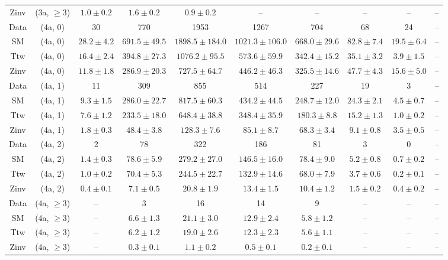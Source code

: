 \begin{table}[h!]
{\begin{tabular}{cccccccccc}
	Zinv & (3a, $\ge3$) & $1.0\pm 0.2$ & $1.6\pm 0.2$ & $0.9\pm 0.2$ & -- & -- & -- & -- & -- \\[0.5ex] 
	Data & (4a, 0) & 30 & 770 & 1953 & 1267 & 704 & 68 & 24 & -- \\[0.5ex] 
	SM & (4a, 0) & $28.2\pm 4.2$ & $691.5\pm 49.5$ & $1898.5\pm 184.0$ & $1021.3\pm 106.0$ & $668.0\pm 29.6$ & $82.8\pm 7.4$ & $19.5\pm 6.4$ & -- \\[0.5ex] 
	Ttw & (4a, 0) & $16.4\pm 2.4$ & $394.8\pm 27.3$ & $1076.2\pm 95.5$ & $573.6\pm 59.9$ & $342.4\pm 15.2$ & $35.1\pm 3.2$ & $3.9\pm 1.5$ & -- \\[0.5ex] 
	Zinv & (4a, 0) & $11.8\pm 1.8$ & $286.9\pm 20.3$ & $727.5\pm 64.7$ & $446.2\pm 46.3$ & $325.5\pm 14.6$ & $47.7\pm 4.3$ & $15.6\pm 5.0$ & -- \\[0.5ex] 
	Data & (4a, 1) & 11 & 309 & 855 & 514 & 227 & 19 & 3 & -- \\[0.5ex] 
	SM & (4a, 1) & $9.3\pm 1.5$ & $286.0\pm 22.7$ & $817.5\pm 60.3$ & $434.2\pm 44.5$ & $248.7\pm 12.0$ & $24.3\pm 2.1$ & $4.5\pm 0.7$ & -- \\[0.5ex] 
	Ttw & (4a, 1) & $7.6\pm 1.2$ & $233.5\pm 18.0$ & $648.4\pm 38.8$ & $348.4\pm 35.9$ & $180.3\pm 8.8$ & $15.2\pm 1.3$ & $1.0\pm 0.2$ & -- \\[0.5ex] 
	Zinv & (4a, 1) & $1.8\pm 0.3$ & $48.4\pm 3.8$ & $128.3\pm 7.6$ & $85.1\pm 8.7$ & $68.3\pm 3.4$ & $9.1\pm 0.8$ & $3.5\pm 0.5$ & -- \\[0.5ex] 
	Data & (4a, 2) & 2 & 78 & 322 & 186 & 81 & 3 & 0 & -- \\[0.5ex] 
	SM & (4a, 2) & $1.4\pm 0.3$ & $78.6\pm 5.9$ & $279.2\pm 27.0$ & $146.5\pm 16.0$ & $78.4\pm 9.0$ & $5.2\pm 0.8$ & $0.7\pm 0.2$ & -- \\[0.5ex] 
	Ttw & (4a, 2) & $1.0\pm 0.2$ & $70.4\pm 5.3$ & $244.5\pm 22.7$ & $132.9\pm 14.6$ & $68.0\pm 7.9$ & $3.7\pm 0.6$ & $0.2\pm 0.1$ & -- \\[0.5ex] 
	Zinv & (4a, 2) & $0.4\pm 0.1$ & $7.1\pm 0.5$ & $20.8\pm 1.9$ & $13.4\pm 1.5$ & $10.4\pm 1.2$ & $1.5\pm 0.2$ & $0.4\pm 0.2$ & -- \\[0.5ex] 
	Data & (4a, $\ge3$) & -- & 3 & 16 & 14 & 9 & -- & -- & -- \\[0.5ex] 
	SM & (4a, $\ge3$) & -- & $6.6\pm 1.3$ & $21.1\pm 3.0$ & $12.9\pm 2.4$ & $5.8\pm 1.2$ & -- & -- & -- \\[0.5ex] 
	Ttw & (4a, $\ge3$) & -- & $6.2\pm 1.2$ & $19.0\pm 2.6$ & $12.3\pm 2.3$ & $5.6\pm 1.1$ & -- & -- & -- \\[0.5ex] 
	Zinv & (4a, $\ge3$) & -- & $0.3\pm 0.1$ & $1.1\pm 0.2$ & $0.5\pm 0.1$ & $0.2\pm 0.1$ & -- & -- & -- \\[0.5ex] 

\end{tabular}}
\end{table}
